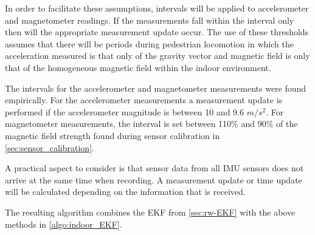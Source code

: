 In order to facilitate these assumptions, intervals will be applied to accelerometer and magnetometer readings. If the measurements fall within the interval only then will the appropriate measurement update occur. The use of these thresholds assumes that there will be periods during pedestrian locomotion in which the acceleration measured is that only of the gravity vector and magnetic field is only that of the homogeneous magnetic field within the indoor environment. \par 

The intervals for the accelerometer and magnetometer measurements were found empirically. For the accelerometer measurements a measurement update is performed if the accelerometer magnitude is between 10 and 9.6 $ m/s^2 $. For magnetometer measurements, the interval is set between 110\% and 90\% of the magnetic field strength found during sensor calibration in \cref{sec:sensor_calibration}. \par 

A practical aspect to consider is that sensor data from all IMU sensors does not arrive at the same time when recording. A measurement update or time update will be calculated depending on the information that is received. \par 

The resulting algorithm combines the EKF from \cref{sec:rw-EKF} with the above methods in \cref{algo:indoor_EKF}.

